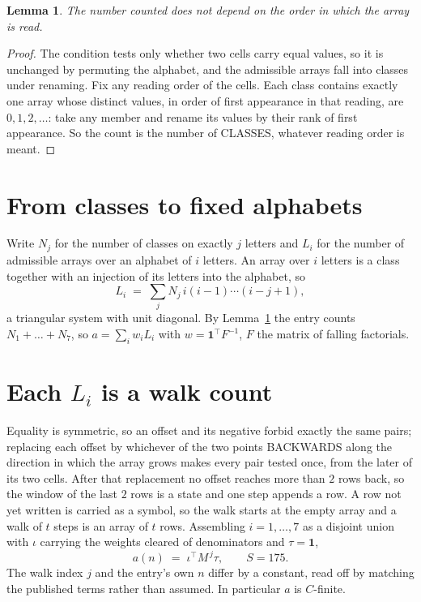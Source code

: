 \documentclass[11pt,a4paper]{article}
\theoremstyle{plain}
\newtheorem{lemma}[theorem]{Lemma}
\theoremstyle{definition}
\begin{document}
\begin{lemma}\label{lem:order}
The number counted does not depend on the order in which the array is read.
\end{lemma}

\begin{proof}
The condition tests only whether two cells carry equal values, so it is unchanged by permuting
the alphabet, and the admissible arrays fall into classes under renaming. Fix any reading order
of the cells. Each class contains exactly one array whose distinct values, in order of first
appearance in that reading, are $0,1,2,\dots$: take any member and rename its values by their
rank of first appearance. So the count is the number of CLASSES, whatever reading order is
meant.
\end{proof}

\section{From classes to fixed alphabets}

Write $N_j$ for the number of classes on exactly $j$ letters and $L_i$ for the number of
admissible arrays over an alphabet of $i$ letters. An array over $i$ letters is a class together
with an injection of its letters into the alphabet, so
\[
L_i\;=\;\sum_j N_j\,i(i-1)\cdots(i-j+1),
\]
a triangular system with unit diagonal. By Lemma~\ref{lem:order} the entry counts
$N_1+\dots+N_{7}$, so $a=\sum_i w_iL_i$ with $w=\mathbf{1}^{\!\top}F^{-1}$, $F$ the
matrix of falling factorials.

\section{Each $L_i$ is a walk count}

Equality is symmetric, so an offset and its negative forbid exactly the same pairs; replacing
each offset by whichever of the two points BACKWARDS along the direction in which the array
grows makes every pair tested once, from the later of its two cells. After that replacement no
offset reaches more than $2$ rows back, so the window of the last $2$
rows is a state and one step appends a row. A row not yet written is
carried as a symbol, so the walk starts at the empty array and a walk of $t$ steps is an array
of $t$ rows. Assembling $i=1,\dots,7$ as a disjoint union with $\iota$ carrying the
weights cleared of denominators and $\tau=\mathbf{1}$,
\[
a(n)\;=\;\iota^{\!\top}M^{\,j}\tau ,\qquad S=175.
\]
The walk index $j$ and the entry's own $n$ differ by a constant, read off by matching the
published terms rather than assumed. In particular $a$ is $C$-finite.
\end{document}
